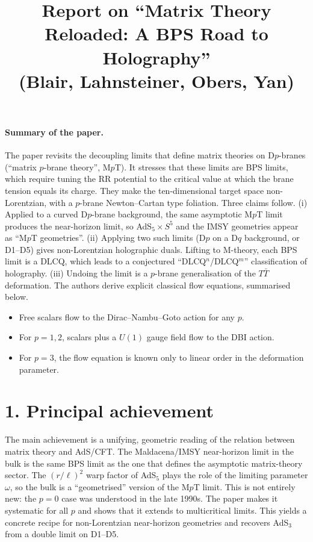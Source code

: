 \documentclass[11pt]{article}
\title{Report on ``Matrix Theory Reloaded: A BPS Road to Holography''\\[2pt]
\large (Blair, Lahnsteiner, Obers, Yan)}
\date{}
\begin{document}
\maketitle

\paragraph{Summary of the paper.}
The paper revisits the decoupling limits that define matrix theories on D$p$-branes (``matrix $p$-brane theory'', M$p$T). It stresses that these limits are BPS limits, which require tuning the RR potential to the critical value at which the brane tension equals its charge. They make the ten-dimensional target space non-Lorentzian, with a $p$-brane Newton--Cartan type foliation. Three claims follow. (i) Applied to a curved D$p$-brane background, the same asymptotic M$p$T limit produces the near-horizon limit, so AdS$_5\times S^5$ and the IMSY geometries appear as ``M$p$T geometries''. (ii) Applying two such limits (D$p$ on a D$q$ background, or D1--D5) gives non-Lorentzian holographic duals. Lifting to M-theory, each BPS limit is a DLCQ, which leads to a conjectured ``DLCQ$^n$/DLCQ$^m$'' classification of holography. (iii) Undoing the limit is a $p$-brane generalisation of the $T\bar T$ deformation. The authors derive explicit classical flow equations, summarised below.
\begin{itemize}
\item Free scalars flow to the Dirac--Nambu--Goto action for any $p$.
\item For $p=1,2$, scalars plus a $U(1)$ gauge field flow to the DBI action.
\item For $p=3$, the flow equation is known only to linear order in the deformation parameter.
\end{itemize}

\section*{1. Principal achievement}
The main achievement is a unifying, geometric reading of the relation between matrix theory and AdS/CFT. The Maldacena/IMSY near-horizon limit in the bulk is the same BPS limit as the one that defines the asymptotic matrix-theory sector. The $(r/\ell)^2$ warp factor of AdS$_5$ plays the role of the limiting parameter $\omega$, so the bulk is a ``geometrised'' version of the M$p$T limit. This is not entirely new: the $p=0$ case was understood in the late 1990s. The paper makes it systematic for all $p$ and shows that it extends to multicritical limits. This yields a concrete recipe for non-Lorentzian near-horizon geometries and recovers AdS$_3$ from a double limit on D1--D5.
\end{document}
